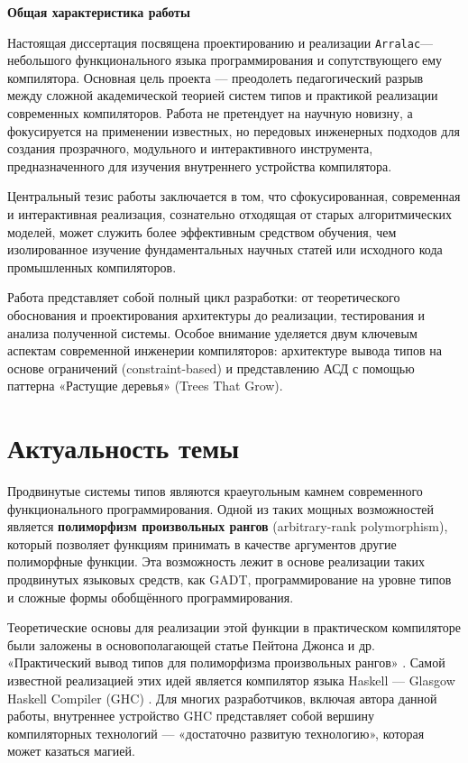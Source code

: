 
\newcommand{\Arralac}{\texttt{Arralac}}

\textbf{Общая характеристика работы}

Настоящая диссертация посвящена проектированию и реализации \Arralac — небольшого функционального языка программирования и сопутствующего ему компилятора. Основная цель проекта — преодолеть педагогический разрыв между сложной академической теорией систем типов и практикой реализации современных компиляторов. Работа не претендует на научную новизну, а фокусируется на применении известных, но передовых инженерных подходов для создания прозрачного, модульного и интерактивного инструмента, предназначенного для изучения внутреннего устройства компилятора.

Центральный тезис работы заключается в том, что сфокусированная, современная и интерактивная реализация, сознательно отходящая от старых алгоритмических моделей, может служить более эффективным средством обучения, чем изолированное изучение фундаментальных научных статей или исходного кода промышленных компиляторов.

Работа представляет собой полный цикл разработки: от теоретического обоснования и проектирования архитектуры до реализации, тестирования и анализа полученной системы. Особое внимание уделяется двум ключевым аспектам современной инженерии компиляторов: архитектуре вывода типов на основе ограничений (constraint-based) и представлению АСД с помощью паттерна «Растущие деревья» (Trees That Grow).

\newpage

\section*{Актуальность темы}

Продвинутые системы типов являются краеугольным камнем современного функционального программирования. Одной из таких мощных возможностей является \textbf{полиморфизм произвольных рангов} (arbitrary-rank polymorphism), который позволяет функциям принимать в качестве аргументов другие полиморфные функции. Эта возможность лежит в основе реализации таких продвинутых языковых средств, как GADT, программирование на уровне типов и сложные формы обобщённого программирования.

Теоретические основы для реализации этой функции в практическом компиляторе были заложены в основополагающей статье Пейтона Джонса и др. «Практический вывод типов для полиморфизма произвольных рангов» \cite{jones-practical-2007}. Самой известной реализацией этих идей является компилятор языка Haskell — Glasgow Haskell Compiler (GHC) \cite{ghc-site-2025}. Для многих разработчиков, включая автора данной работы, внутреннее устройство GHC представляет собой вершину компиляторных технологий — «достаточно развитую технологию», которая может казаться магией.


